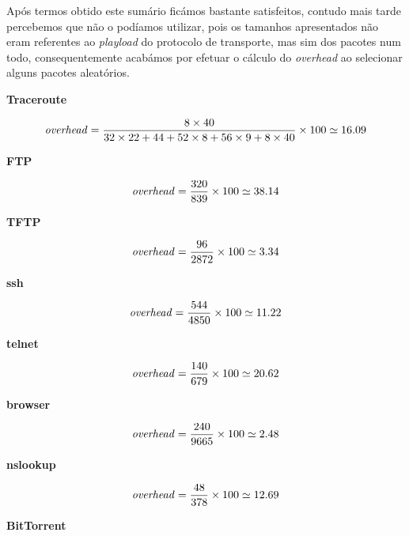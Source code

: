     Após termos obtido este sumário ficámos bastante satisfeitos, contudo mais tarde percebemos que não o podíamos utilizar, pois os tamanhos apresentados não eram referentes ao \textit{playload} do protocolo de transporte, mas sim dos pacotes num todo, consequentemente acabámos por efetuar o cálculo do \textit{overhead} ao selecionar alguns pacotes aleatórios.
    
    \vspace{5pt}
    \textbf{\large Traceroute}
    \vspace{-15pt}

    \[
      \text{\textit{overhead}} 
      = \dfrac
        {8 \times 40}
        {32 \times 22 + 44 + 52 \times 8 + 56 \times 9 + 8 \times 40}
        \times 100
    \simeq 16.09
    \]

    \textbf{\large FTP}
    \vspace{-15pt}

    \[
      \text{\textit{overhead}} 
      = \dfrac
        {320}
        {839}
        \times 100
    \simeq 38.14
    \]

    \textbf{\large TFTP}
    \vspace{-15pt}

    \[
      \text{\textit{overhead}} 
      = \dfrac
        {96}
        {2872}
        \times 100
    \simeq 3.34
    \]

    \textbf{\large ssh}
    \vspace{-15pt}

    \[
      \text{\textit{overhead}} 
      = \dfrac
        {544}
        {4850}
        \times 100
    \simeq 11.22
    \]

    \textbf{\large telnet}
    \vspace{-15pt}

    \[
      \text{\textit{overhead}} 
      = \dfrac
        {140}
        {679}
        \times 100
    \simeq 20.62
    \]

    \textbf{\large browser}
    \vspace{-15pt}

    \[
      \text{\textit{overhead}} 
      = \dfrac
        {240}
        {9665}
        \times 100
    \simeq 2.48
    \]

    \textbf{\large nslookup}
    \vspace{-15pt}

    \[
      \text{\textit{overhead}} 
      = \dfrac
        {48}
        {378}
        \times 100
    \simeq 12.69
    \]

    \textbf{\large BitTorrent}
    \vspace{-15pt}

